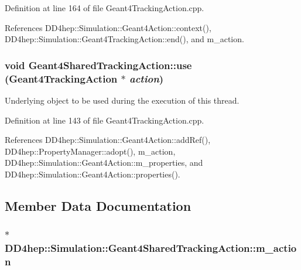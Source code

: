 Definition at line 164 of file Geant4TrackingAction.cpp.

References DD4hep::Simulation::Geant4Action::context(), DD4hep::Simulation::Geant4TrackingAction::end(), and m\_\-action.\hypertarget{class_d_d4hep_1_1_simulation_1_1_geant4_shared_tracking_action_a7810fb89525433a623056dcb8afb5b48}{
\subsubsection[{use}]{\setlength{\rightskip}{0pt plus 5cm}void Geant4SharedTrackingAction::use ({\bf Geant4TrackingAction} $\ast$ {\em action})}}
\label{class_d_d4hep_1_1_simulation_1_1_geant4_shared_tracking_action_a7810fb89525433a623056dcb8afb5b48}


Underlying object to be used during the execution of this thread. 

Definition at line 143 of file Geant4TrackingAction.cpp.

References DD4hep::Simulation::Geant4Action::addRef(), DD4hep::PropertyManager::adopt(), m\_\-action, DD4hep::Simulation::Geant4Action::m\_\-properties, and DD4hep::Simulation::Geant4Action::properties().

\subsection{Member Data Documentation}
\hypertarget{class_d_d4hep_1_1_simulation_1_1_geant4_shared_tracking_action_ab28be90db22491588dd12675fd21d8cb}{
\subsubsection[{m\_\-action}]{$\ast$ {\bf DD4hep::Simulation::Geant4SharedTrackingAction::m\_\-action}}}
\label{class_d_d4hep_1_1_simulation_1_1_geant4_shared_tracking_action_ab28be90db22491588dd12675fd21d8cb}


